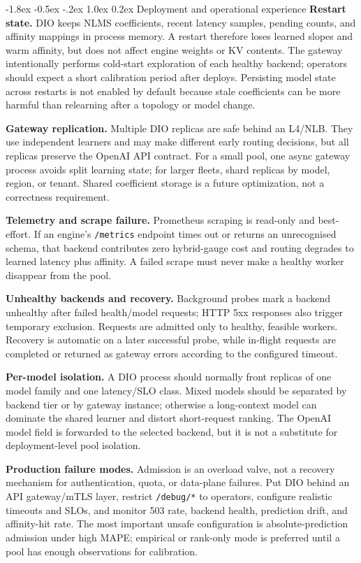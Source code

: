 \documentclass[pdflatex,sn-mathphys-num]{sn-jnl}
\makeatletter
\renewcommand{\section}{\@startsection{section}{1}{\z@}%
  {-1.8ex \@plus -0.5ex \@minus -.2ex}%
  {1.0ex \@plus 0.2ex}%
  {\needspace{4\baselineskip}\normalfont\large\bfseries}}%
\makeatother
\begin{document}
\section{Deployment and operational experience}
\label{sec:operations}
\textbf{Restart state.} DIO keeps NLMS coefficients, recent latency samples,
pending counts, and affinity mappings in process memory. A restart therefore loses
learned slopes and warm affinity, but does not affect engine weights or KV contents.
The gateway intentionally performs cold-start exploration of each healthy backend;
operators should expect a short calibration period after deploys. Persisting model
state across restarts is not enabled by default because stale coefficients can be
more harmful than relearning after a topology or model change.

\textbf{Gateway replication.} Multiple DIO replicas are safe behind an L4/NLB.
They use independent learners and may make different early routing decisions, but
all replicas preserve the OpenAI API contract. For a small pool, one async gateway
process avoids split learning state; for larger fleets, shard replicas by model,
region, or tenant. Shared coefficient storage is a future optimization, not a
correctness requirement.

\textbf{Telemetry and scrape failure.} Prometheus scraping is read-only and
best-effort. If an engine's \texttt{/metrics} endpoint times out or returns an
unrecognised schema, that backend contributes zero hybrid-gauge cost and routing
degrades to learned latency plus affinity. A failed scrape must never make a
healthy worker disappear from the pool.

\textbf{Unhealthy backends and recovery.} Background probes mark a backend
unhealthy after failed health/model requests; HTTP 5xx responses also trigger
temporary exclusion. Requests are admitted only to healthy, feasible workers.
Recovery is automatic on a later successful probe, while in-flight requests are
completed or returned as gateway errors according to the configured timeout.

\textbf{Per-model isolation.} A DIO process should normally front replicas of one
model family and one latency/SLO class. Mixed models should be separated by
backend tier or by gateway instance; otherwise a long-context model can dominate
the shared learner and distort short-request ranking. The OpenAI model field is
forwarded to the selected backend, but it is not a substitute for deployment-level
pool isolation.

\textbf{Production failure modes.} Admission is an overload valve, not a recovery
mechanism for authentication, quota, or data-plane failures. Put DIO behind an
API gateway/mTLS layer, restrict \texttt{/debug/*} to operators, configure realistic
timeouts and SLOs, and monitor 503 rate, backend health, prediction drift, and
affinity-hit rate. The most important unsafe configuration is absolute-prediction
admission under high MAPE; empirical or rank-only mode is preferred until a pool
has enough observations for calibration.
\end{document}
